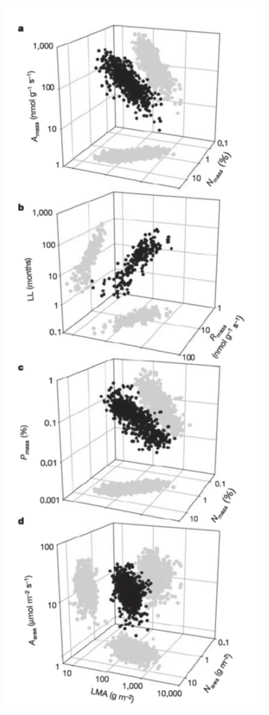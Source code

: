 \documentclass[
  12pt,
  oneside]{book}
\begin{document}
\begin{figure}

{\centering \includegraphics[width=0.8\linewidth]{figures/chap7/f75_LES_wright} 

}
\end{figure}
\end{document}
